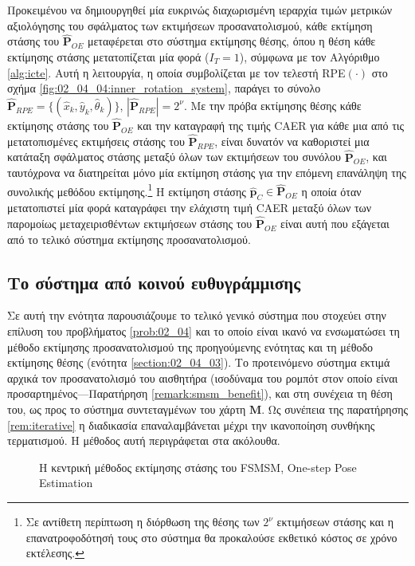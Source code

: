 Προκειμένου να δημιουργηθεί μία ευκρινώς διαχωρισμένη ιεραρχία τιμών μετρικών
αξιολόγησης του σφάλματος των εκτιμήσεων προσανατολισμού, κάθε εκτίμηση στάσης
του $\hat{\bm{P}}_{OE}$ μεταφέρεται στο σύστημα εκτίμησης θέσης, όπου η θέση
κάθε εκτίμησης στάσης μετατοπίζεται μία φορά ($I_T = 1$), σύμφωνα με τον
Αλγόριθμο \ref{alg:icte}. Αυτή η λειτουργία, η οποία συμβολίζεται με τον τελεστή
RPE$(\cdot)$ στο σχήμα \ref{fig:02_04_04:inner_rotation_system}, παράγει το
σύνολο $\hat{\bm{P}}_{RPE} = \{(\hat{x}_k, \hat{y}_k, \hat{\theta}_k)\}$,
$|\hat{\bm{P}}_{RPE}| = 2^\nu$. Με την πρόβα εκτίμησης θέσης κάθε εκτίμησης
στάσης του $\hat{\bm{P}}_{OE}$ και την καταγραφή της τιμής CAER για κάθε μια
από τις μετατοπισμένες εκτιμήσεις στάσης του $\hat{\bm{P}}_{RPE}$, είναι
δυνατόν να καθοριστεί μια κατάταξη σφάλματος στάσης μεταξύ όλων των εκτιμήσεων
του συνόλου $\hat{\bm{P}}_{OE}$, και ταυτόχρονα να διατηρείται μόνο μία
εκτίμηση στάσης για την επόμενη επανάληψη της συνολικής μεθόδου
εκτίμησης.\footnote{Σε αντίθετη περίπτωση η διόρθωση της θέσης των $2^\nu$
εκτιμήσεων στάσης και η επανατροφοδότησή τους στο σύστημα θα προκαλούσε
εκθετικό κόστος σε χρόνο εκτέλεσης.} Η εκτίμηση στάσης $\hat{\bm{p}}_C \in
\hat{\bm{P}}_{OE}$ η οποία όταν μετατοπιστεί μία φορά καταγράφει την ελάχιστη
τιμή CAER μεταξύ όλων των παρομοίως μεταχειρισθέντων εκτιμήσεων στάσης του
$\hat{\bm{P}}_{OE}$ είναι αυτή που εξάγεται από το τελικό σύστημα εκτίμησης
προσανατολισμού.


\subsection{Το σύστημα από κοινού ευθυγράμμισης}
\label{subsection:02_04_04:02}

Σε αυτή την ενότητα παρουσιάζουμε το τελικό γενικό σύστημα που στοχεύει στην
επίλυση του προβλήματος \ref{prob:02_04} και το οποίο είναι ικανό να
ενσωματώσει τη μέθοδο εκτίμησης προσανατολισμού της προηγούμενης ενότητας και
τη μέθοδο εκτίμησης θέσης (ενότητα \ref{section:02_04_03}). Το προτεινόμενο
σύστημα εκτιμά αρχικά τον προσανατολισμό του αισθητήρα (ισοδύναμα του ρομπότ
στον οποίο είναι προσαρτημένος---Παρατήρηση \ref{remark:smsm_benefit}), και στη
συνέχεια τη θέση του, ως προς το σύστημα συντεταγμένων του χάρτη $\bm{M}$. Ως
συνέπεια της παρατήρησης \ref{rem:iterative} η διαδικασία επαναλαμβάνεται
μέχρι την ικανοποίηση συνθήκης τερματισμού. Η μέθοδος αυτή περιγράφεται στα
ακόλουθα.

\begin{figure}\centering
  
  \caption{\small Η κεντρική μέθοδος εκτίμησης στάσης του FSMSM,
           One-step Pose Estimation}
  \label{fig:02_04_04:inner_system}
\end{figure}


